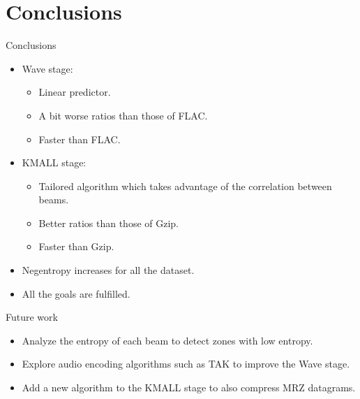 \documentclass[usenames,dvipsnames]{beamer}
\begin{document}
\section{Conclusions}
\begin{frame}{Conclusions}
\begin{itemize}
	\item Wave stage:
	\begin{itemize}
		\item Linear predictor.
		\item A bit worse ratios than those of FLAC.
		\item Faster than FLAC.
	\end{itemize}
	
	\item KMALL stage:
	\begin{itemize}
		\item Tailored algorithm which takes advantage of the correlation between beams.
		\item Better ratios than those of Gzip.
		\item Faster than Gzip.
	\end{itemize}
	\item Negentropy increases for all the dataset.
	\item All the goals are fulfilled.
\end{itemize}
\end{frame}

\begin{frame}{Future work}
\begin{itemize}
	\item Analyze the entropy of each beam to detect zones with low entropy.
	\item Explore audio encoding algorithms such as TAK to improve the Wave stage.
	\item Add a new algorithm to the KMALL stage to also compress MRZ datagrams.
\end{itemize}
\end{frame}
\end{document}

